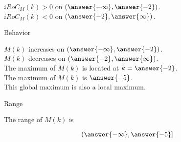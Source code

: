 \documentclass{ximera}
\begin{document}
\begin{exercise}
\begin{question}
$iRoC_M(k) > 0$ on $\left( \answer{-\infty}, \answer{-2} \right)$. \\


$iRoC_M(k) < 0$ on $\left( \answer{-2}, \answer{\infty} \right)$. \\

\end{question}





\begin{question} Behavior



$M(k)$ increases on $\left( \answer{-\infty}, \answer{-2} \right)$. \\


$M(k)$ decreases on $\left( \answer{-2}, \answer{\infty} \right)$. \\


The maximum of $M(k)$ is located at  $k = \answer{-2}$. \\


The maximum of $M(k)$ is $\answer{-5}$. \\


This global maximum is also a local maximum.

\end{question}










\begin{question} Range



The range of $M(k)$ is 

\[
\left( \answer{-\infty}, \answer{-5} \right]
\]



\end{question}









\end{exercise}
\end{document}
